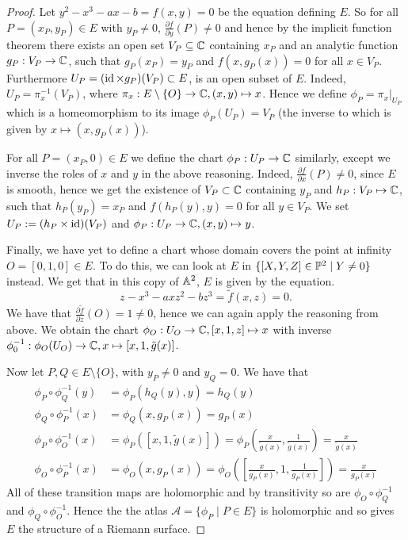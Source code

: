 \begin{proof}
	Let $y^2 - x^3 - ax - b = f(x, y) = 0$ be the equation defining $E$.
	So for all $P = (x_P, y_P) \in E$ with $y_P \neq 0$,
	$\frac{\partial f}{\partial y}(P) \neq 0$ and hence by the implicit function
	theorem there exists an open set $V_P \subseteq \mathbb{C}$ containing $x_P$ and an
	analytic function $g_P: V_P \to \mathbb{C}$, such that $g_P(x_P) = y_P$ and
	$f(x, g_P(x)) = 0$ for all $x \in V_P$. 
	Furthermore $U_P = (\operatorname{id}\times g_P)(V_P) \subset E$,
	is an open subset of $E$. Indeed, $U_P = \pi_x^{-1}(V_P)$, where
	$\pi_x: E\setminus\{O\} \to \mathbb{C}, (x, y) \mapsto x$.
	Hence we define
	$\phi_P = \pi_x\vert_{U_P}$ which is a homeomorphism to its
	image $\phi_P(U_P) = V_P$ (the inverse to which is given by
	$x \mapsto (x, g_P(x))$).

	For all $P = (x_P, 0) \in E$ we define the chart $\phi_P: U_P \to \mathbb{C}$
	similarly, except we inverse the roles of $x$ and $y$ in the above reasoning.
	Indeed, $\frac{\partial f}{\partial x}(P) \neq 0$, since $E$ is smooth,
	hence we get the existence of $V_P \subset \mathbb{C}$ containing $y_P$ and
	$h_P: V_P \mapsto \mathbb{C}$, such that $h_P(y_P) = x_P$ and
	$f(h_P(y), y) = 0$ for all $y \in V_P$. We set
	$U_P := (h_P \times \operatorname{id})(V_P)$ and 
	$\phi_P: U_P \to \mathbb{C}, (x, y) \mapsto y$.

	Finally, we have yet to define a chart whose domain covers the point at
	infinity $O = [0, 1, 0] \in E$. To do this, we can look at $E$
	in $\{[X, Y, Z] \in \mathbb{P}^2 \mid Y \neq 0\}$ instead.
	We get that in this copy of $\mathbb{A}^2$, $E$ is given by
	the equation. 
	\begin{equation*}
		z - x^3 - axz^2 - bz^3 = \tilde f(x, z) = 0.
	\end{equation*}
	We have that $\frac{\partial \tilde f}{\partial z} (O) = 1 \neq 0$, hence we
	can again apply the reasoning from above. We obtain the chart
	$\phi_O: U_O \to \mathbb{C}, [x, 1, z] \mapsto x$ with inverse
	$\phi_0^{-1}: \phi_O(U_O) \to \mathbb{C}, x \mapsto [x, 1, \tilde g(x)]$.

	Now let $P, Q \in E \setminus \{O\}$, with $y_P \neq 0$ and $y_Q = 0$.
	We have that
	\begin{align*}
		\phi_P \circ \phi_Q^{-1} (y) &= \phi_P(h_Q(y), y) = h_Q(y)\\
		\phi_Q \circ \phi_P^{-1} (x) &= \phi_{Q}(x, g_P(x)) = g_P(x)\\
		\phi_P\circ \phi_O^{-1}(x) &= \phi_P([x, 1, \tilde g(x)])
		= \phi_P\left(\frac{x}{\tilde g(x)},
		\frac{1}{\tilde g(x)}\right) = \frac{x}{\tilde g(x)}\\
		\phi_O\circ \phi_P^{-1}(x) &= \phi_O(x, g_P(x))
		= \phi_O\left(\left[\frac{x}{g_P(x)}, 1, \frac{1}{g_P(x)}\right]\right)
		= \frac{x}{g_P(x)}
	\end{align*}
	All of these transition maps are holomorphic and by transitivity so are
	$\phi_O \circ \phi_Q^{-1}$ and $\phi_Q \circ \phi_O^{-1}$.
	Hence the the atlas $\mathcal{A} = \{\phi_P \mid P \in E\}$ is
	holomorphic
	and so gives $E$ the structure of a Riemann surface.
\end{proof}


